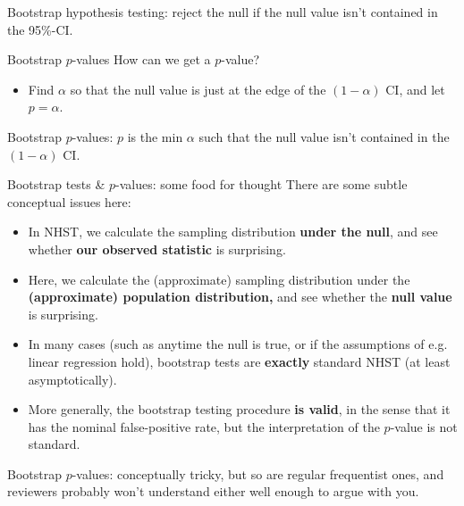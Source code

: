 \documentclass{beamer} %
\begin{document}
\begin{frame}[standout]
Bootstrap hypothesis testing: reject the null if the null value isn't contained in the 95\%-CI.
\end{frame}

\begin{frame}{Bootstrap $p$-values}
How can we get a $p$-value? 
\begin{itemize}
\item Find $\alpha$ so that the null value is just at the edge of the $(1-\alpha)$ CI,
 and let $p = \alpha$.
\end{itemize}
\end{frame}

\begin{frame}[standout]
Bootstrap $p$-values: $p$ is the min $\alpha$ such that the null value isn't contained in the $(1-\alpha)$ CI.
\end{frame}

\begin{frame}{Bootstrap tests \& $p$-values: some food for thought}
There are some subtle conceptual issues here:
\begin{itemize}[<+(1)->]
\item In NHST, we calculate the sampling distribution \textbf{under the null}, and see whether \textbf{our observed statistic} is surprising.
\item Here, we calculate the (approximate) sampling distribution under the \textbf{(approximate) population distribution,} and see whether the \textbf{null value} is surprising.
\item In many cases (such as anytime the null is true, or if the assumptions of e.g. linear regression hold), bootstrap tests are \textbf{exactly} standard NHST (at least asymptotically).
\item More generally, the bootstrap testing procedure \textbf{is valid}, in the sense that it has the nominal false-positive rate, but the interpretation of the $p$-value is not standard.  
\end{itemize}
\end{frame}

\begin{frame}[standout]
Bootstrap $p$-values: conceptually tricky, but so are regular frequentist ones, and reviewers probably won't understand either well enough to argue with you. 
\end{frame}
\end{document}
